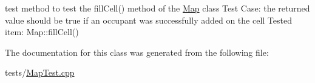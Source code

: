 test method to test the fill\+Cell() method of the \hyperlink{classMap}{Map} class Test Case\+: the returned value should be true if an occupant was successfully added on the cell Tested item\+: Map\+::fill\+Cell() 

The documentation for this class was generated from the following file\+:\begin{DoxyCompactItemize}
\item 
tests/\hyperlink{MapTest_8cpp}{Map\+Test.\+cpp}\end{DoxyCompactItemize}
